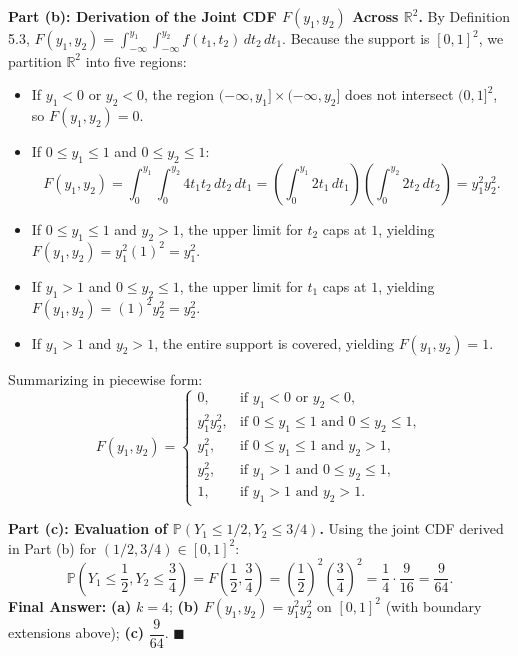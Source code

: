 \documentclass[11pt, letterpaper]{article}
\theoremstyle{definition}
\theoremstyle{remark}
\begin{document}
\textbf{Part (b): Derivation of the Joint CDF $F(y_1, y_2)$ Across $\mathbb{R}^2$.}
By Definition 5.3, $F(y_1, y_2) = \int_{-\infty}^{y_1} \int_{-\infty}^{y_2} f(t_1, t_2) \, dt_2 \, dt_1$. Because the support is $[0, 1]^2$, we partition $\mathbb{R}^2$ into five regions:
\begin{itemize}
    \item If $y_1 < 0$ or $y_2 < 0$, the region $(-\infty, y_1] \times (-\infty, y_2]$ does not intersect $(0, 1]^2$, so $F(y_1, y_2) = 0$.
    \item If $0 \le y_1 \le 1$ and $0 \le y_2 \le 1$:
    \[
        F(y_1, y_2) = \int_{0}^{y_1} \int_{0}^{y_2} 4 t_1 t_2 \, dt_2 \, dt_1 = \left( \int_{0}^{y_1} 2t_1 \, dt_1 \right) \left( \int_{0}^{y_2} 2t_2 \, dt_2 \right) = y_1^2 y_2^2.
    \]
    \item If $0 \le y_1 \le 1$ and $y_2 > 1$, the upper limit for $t_2$ caps at $1$, yielding $F(y_1, y_2) = y_1^2 (1)^2 = y_1^2$.
    \item If $y_1 > 1$ and $0 \le y_2 \le 1$, the upper limit for $t_1$ caps at $1$, yielding $F(y_1, y_2) = (1)^2 y_2^2 = y_2^2$.
    \item If $y_1 > 1$ and $y_2 > 1$, the entire support is covered, yielding $F(y_1, y_2) = 1$.
\end{itemize}
Summarizing in piecewise form:
\[
    F(y_1, y_2) = \begin{cases}
        0, & \text{if } y_1 < 0 \text{ or } y_2 < 0, \\
        y_1^2 y_2^2, & \text{if } 0 \le y_1 \le 1 \text{ and } 0 \le y_2 \le 1, \\
        y_1^2, & \text{if } 0 \le y_1 \le 1 \text{ and } y_2 > 1, \\
        y_2^2, & \text{if } y_1 > 1 \text{ and } 0 \le y_2 \le 1, \\
        1, & \text{if } y_1 > 1 \text{ and } y_2 > 1.
    \end{cases}
\]

\textbf{Part (c): Evaluation of $\mathbb{P}(Y_1 \le 1/2, Y_2 \le 3/4)$.}
Using the joint CDF derived in Part (b) for $(1/2, 3/4) \in [0, 1]^2$:
\[
    \mathbb{P}\!\left(Y_1 \le \frac{1}{2}, Y_2 \le \frac{3}{4}\right) = F\!\left(\frac{1}{2}, \frac{3}{4}\right) = \left(\frac{1}{2}\right)^2 \left(\frac{3}{4}\right)^2 = \frac{1}{4} \cdot \frac{9}{16} = \frac{9}{64}.
\]
\textbf{Final Answer:} \textbf{(a)} $k = 4$; \quad \textbf{(b)} $F(y_1, y_2) = y_1^2 y_2^2$ on $[0,1]^2$ (with boundary extensions above); \quad \textbf{(c)} $\dfrac{9}{64}$. $\blacksquare$
\end{document}
